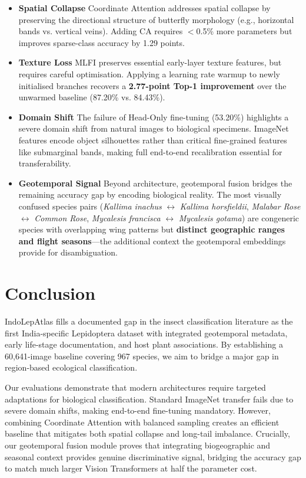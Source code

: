\documentclass[runningheads]{llncs}
\begin{document}
\begin{itemize}
    \item \textbf{Spatial Collapse} Coordinate Attention addresses spatial collapse by preserving the directional structure of butterfly morphology (e.g., horizontal bands vs. vertical veins). Adding CA requires $<$0.5\% more parameters but improves sparse-class accuracy by 1.29 points.
    \item \textbf{Texture Loss} MLFI preserves essential early-layer texture features, but requires careful optimisation. Applying a learning rate warmup to newly initialised branches recovers a \textbf{2.77-point Top-1 improvement} over the unwarmed baseline (87.20\% vs. 84.43\%).
    \item \textbf{Domain Shift} The failure of Head-Only fine-tuning (53.20\%) highlights a severe domain shift from natural images to biological specimens. ImageNet features encode object silhouettes rather than critical fine-grained features like submarginal bands, making full end-to-end recalibration essential for transferability.
    \item \textbf{Geotemporal Signal} Beyond architecture, geotemporal fusion bridges the remaining accuracy gap by encoding biological reality. The most visually confused species pairs (\textit{Kallima inachus} $\leftrightarrow$ \textit{Kallima horsfieldii}, \textit{Malabar Rose} $\leftrightarrow$ \textit{Common Rose}, \textit{Mycalesis francisca} $\leftrightarrow$ \textit{Mycalesis gotama}) are congeneric species with overlapping wing patterns but \textbf{distinct geographic ranges and flight seasons}---the additional context the geotemporal embeddings provide for disambiguation.
\end{itemize}

\section{Conclusion}
IndoLepAtlas fills a documented gap in the insect classification literature as the first India-specific Lepidoptera dataset with integrated geotemporal metadata, early life-stage documentation, and host plant associations. By establishing a 60,641-image baseline covering 967 species, we aim to bridge a major gap in region-based ecological classification.

Our evaluations demonstrate that modern architectures require targeted adaptations for biological classification. Standard ImageNet transfer fails due to severe domain shifts, making end-to-end fine-tuning mandatory. However, combining Coordinate Attention with balanced sampling creates an efficient baseline that mitigates both spatial collapse and long-tail imbalance. Crucially, our geotemporal fusion module proves that integrating biogeographic and seasonal context provides genuine discriminative signal, bridging the accuracy gap to match much larger Vision Transformers at half the parameter cost.
\end{document}
